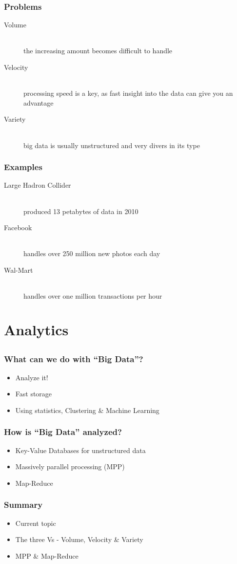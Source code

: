 \documentclass{beamer}
\begin{document}
\begin{frame}
	\frametitle{Problems}
		\begin{description}
			\item[Volume]\hfill \\
				the increasing amount becomes difficult to handle
			\item[Velocity] \hfill \\
				processing speed is a key, as fast insight into the data can give you an advantage
			\item[Variety] \hfill \\
				big data is usually unstructured and very divers in its type
		\end{description}
\end{frame}

\begin{frame}
	\frametitle{Examples}
	\begin{description}
		\item[Large Hadron Collider]\hfill \\
			produced 13 petabytes of data in 2010
		\item[Facebook]\hfill \\
			handles over 250 million new photos each day
		\item[Wal-Mart]\hfill \\
			handles over one million transactions per hour
	\end{description}
\end{frame}

\section{Analytics}
\subsection*{}
\begin{frame}
	\frametitle{What can we do with ``Big Data''?}
		\begin{itemize}
			\item Analyze it!
			\item Fast storage
			\item Using statistics, Clustering \& Machine Learning
		\end{itemize}
\end{frame}

\begin{frame}
	\frametitle{How is ``Big Data'' analyzed?}
	\begin{itemize}
		\item Key-Value Databases for unstructured data
		\item Massively parallel processing (MPP)
		\item Map-Reduce
	\end{itemize}
\end{frame}

\begin{frame}
	\frametitle{Summary}
		\begin{itemize}
			\item Current topic
			\item The three Vs - Volume, Velocity \& Variety
			\item MPP \& Map-Reduce
		\end{itemize}
\end{frame}
\end{document}
